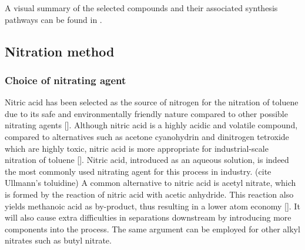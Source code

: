 A visual summary of the selected compounds and their associated synthesis pathways can be found in .

\subsection{Nitration method}
\subsubsection{Choice of nitrating agent}
Nitric acid has been selected as the source of nitrogen for the nitration of toluene due to its safe and environmentally friendly nature compared to other possible nitrating agents []. Although nitric acid is a highly acidic and volatile compound, compared to alternatives such as acetone cyanohydrin and dinitrogen tetroxide which are highly toxic, nitric acid is more appropriate for industrial-scale nitration of toluene []. Nitric acid, introduced as an aqueous solution, is indeed the most commonly used nitrating agent for this process in industry. (cite Ullmann's toluidine) A common alternative to nitric acid is acetyl nitrate, which is formed by the reaction of nitric acid with acetic anhydride. This reaction also yields methanoic acid as by-product, thus resulting in a lower atom economy []. It will also cause extra difficulties in separations downstream by introducing more components into the process. The same argument can be employed for other alkyl nitrates such as butyl nitrate. 



